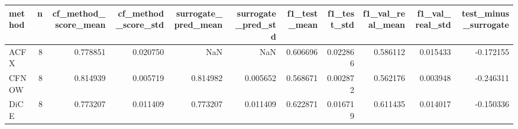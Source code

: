 \begin{tabular}{lrrrrrrrrrr}
\toprule
method &  n &  cf\_method\_score\_mean &  cf\_method\_score\_std &  surrogate\_pred\_mean &  surrogate\_pred\_std &  f1\_test\_mean &  f1\_test\_std &  f1\_val\_real\_mean &  f1\_val\_real\_std &  test\_minus\_surrogate \\
\midrule
  ACFX &  8 &              0.778851 &             0.020750 &                  NaN &                 NaN &      0.606696 &     0.022866 &          0.586112 &         0.015433 &             -0.172155 \\
 CFNOW &  8 &              0.814939 &             0.005719 &             0.814982 &            0.005652 &      0.568671 &     0.002872 &          0.562176 &         0.003948 &             -0.246311 \\
  DiCE &  8 &              0.773207 &             0.011409 &             0.773207 &            0.011409 &      0.622871 &     0.016719 &          0.611435 &         0.014017 &             -0.150336 \\
\bottomrule
\end{tabular}
